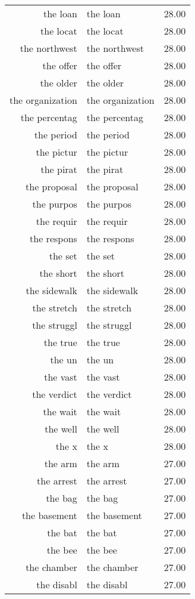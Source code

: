\begin{table}[ht]
\begin{tabular}{rlr}
  the loan & the loan & 28.00 \\ 
  the locat & the locat & 28.00 \\ 
  the northwest & the northwest & 28.00 \\ 
  the offer & the offer & 28.00 \\ 
  the older & the older & 28.00 \\ 
  the organization & the organization & 28.00 \\ 
  the percentag & the percentag & 28.00 \\ 
  the period & the period & 28.00 \\ 
  the pictur & the pictur & 28.00 \\ 
  the pirat & the pirat & 28.00 \\ 
  the proposal & the proposal & 28.00 \\ 
  the purpos & the purpos & 28.00 \\ 
  the requir & the requir & 28.00 \\ 
  the respons & the respons & 28.00 \\ 
  the set & the set & 28.00 \\ 
  the short & the short & 28.00 \\ 
  the sidewalk & the sidewalk & 28.00 \\ 
  the stretch & the stretch & 28.00 \\ 
  the struggl & the struggl & 28.00 \\ 
  the true & the true & 28.00 \\ 
  the un & the un & 28.00 \\ 
  the vast & the vast & 28.00 \\ 
  the verdict & the verdict & 28.00 \\ 
  the wait & the wait & 28.00 \\ 
  the well & the well & 28.00 \\ 
  the x & the x & 28.00 \\ 
  the arm & the arm & 27.00 \\ 
  the arrest & the arrest & 27.00 \\ 
  the bag & the bag & 27.00 \\ 
  the basement & the basement & 27.00 \\ 
  the bat & the bat & 27.00 \\ 
  the bee & the bee & 27.00 \\ 
  the chamber & the chamber & 27.00 \\ 
  the disabl & the disabl & 27.00 \\ 

\end{tabular}
\end{table}
